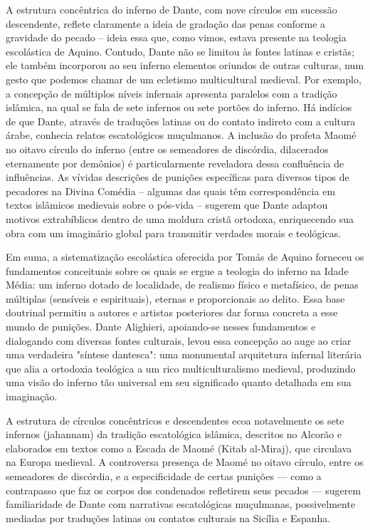 A estrutura concêntrica do inferno de Dante, com nove círculos em sucessão descendente, reflete claramente a ideia de gradação das penas conforme a gravidade do pecado -- ideia essa que, como vimos, estava presente na teologia escolástica de Aquino. Contudo, Dante não se limitou às fontes latinas e cristãs; ele também incorporou ao seu inferno elementos oriundos de outras culturas, num gesto que podemos chamar de um ecletismo multicultural medieval. Por exemplo, a concepção de múltiplos níveis infernais apresenta paralelos com a tradição islâmica, na qual se fala de sete infernos ou sete portões do inferno. Há indícios de que Dante, através de traduções latinas ou do contato indireto com a cultura árabe, conhecia relatos escatológicos muçulmanos. A inclusão do profeta Maomé no oitavo círculo do inferno (entre os semeadores de discórdia, dilacerados eternamente por demônios) é particularmente reveladora dessa confluência de influências. As vívidas descrições de punições específicas para diversos tipos de pecadores na Divina Comédia -- algumas das quais têm correspondência em textos islâmicos medievais sobre o pós-vida -- sugerem que Dante adaptou motivos extrabíblicos dentro de uma moldura cristã ortodoxa, enriquecendo sua obra com um imaginário global para transmitir verdades morais e teológicas.

Em suma, a sistematização escolástica oferecida por Tomás de Aquino forneceu os fundamentos conceituais sobre os quais se ergue a teologia do inferno na Idade Média: um inferno dotado de localidade, de realismo físico e metafísico, de penas múltiplas (sensíveis e espirituais), eternas e proporcionais ao delito. Essa base doutrinal permitiu a autores e artistas posteriores dar forma concreta a esse mundo de punições. Dante Alighieri, apoiando-se nesses fundamentos e dialogando com diversas fontes culturais, levou essa concepção ao auge ao criar uma verdadeira "síntese dantesca": uma monumental arquitetura infernal literária que alia a ortodoxia teológica a um rico multiculturalismo medieval, produzindo uma visão do inferno tão universal em seu significado quanto detalhada em sua imaginação.

A estrutura de círculos concêntricos e descendentes ecoa notavelmente os sete infernos (jahannam) da tradição escatológica islâmica, descritos no Alcorão e elaborados em textos como a Escada de Maomé (Kitab al-Miraj), que circulava na Europa medieval. A controversa presença de Maomé no oitavo círculo, entre os semeadores de discórdia, e a especificidade de certas punições --- como a contrapasso que faz os corpos dos condenados refletirem seus pecados --- sugerem familiaridade de Dante com narrativas escatológicas muçulmanas, possivelmente mediadas por traduções latinas ou contatos culturais na Sicília e Espanha.

